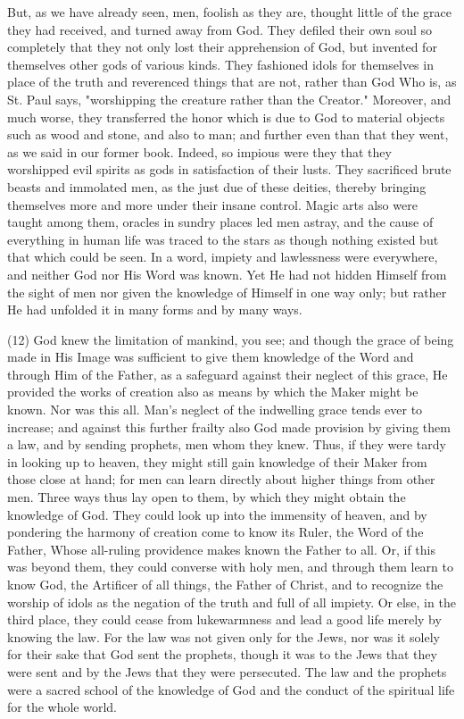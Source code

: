 \documentclass[9pt, twocolumn, oneside, a4paper]{memoir}
\begin{document}
But, as we have already seen, men, foolish as they are, thought little of the       grace they had received, and turned away from God. They defiled their own soul       so completely that they not only lost their apprehension of God, but invented       for themselves other gods of various kinds. They fashioned idols for themselves       in place of the truth and reverenced things that are not, rather than God Who       is, as St. Paul says, "worshipping the creature rather than the       Creator."       Moreover, and much worse, they transferred the honor which is due to God to       material objects such as wood and stone, and also to man; and further       even than       that they went, as we said in our former book. Indeed, so impious were they that       they worshipped evil spirits as gods in satisfaction of their lusts. They       sacrificed brute beasts and immolated men, as the just due of these deities,       thereby bringing themselves more and more under their insane control. Magic arts       also were taught among them, oracles in sundry places led men astray, and the       cause of everything in human life was traced to the stars as though nothing       existed but that which could be seen. In a word, impiety and lawlessness were       everywhere, and neither God nor His Word was known. Yet He had not hidden       Himself from the sight of men nor given the knowledge of Himself in one way       only; but rather He had unfolded it in many forms and by many ways.   

\textsc{(12)} God knew the limitation of mankind, you see; and       though the grace of being made in His Image was sufficient to give them       knowledge of the Word and through Him of the Father, as a safeguard against       their neglect of this grace, He provided the works of creation also as means by       which the Maker might be known. Nor was this all. Man's neglect of the       indwelling grace tends ever to increase; and against this further frailty also       God made provision by giving them a law, and by sending prophets, men whom they       knew. Thus, if they were tardy in looking up to heaven, they might still gain       knowledge of their Maker from those close at hand; for men can learn directly       about higher things from other men. Three ways thus lay open to them, by which       they might obtain the knowledge of God. They could look up into the immensity of       heaven, and by pondering the harmony of creation come to know its Ruler, the       Word of the Father, Whose all-ruling providence makes known the Father to all.       Or, if this was beyond them, they could converse with holy men, and through them       learn to know God, the Artificer of all things, the Father of Christ, and to       recognize the worship of idols as the negation of the truth and full of all       impiety. Or else, in the third place, they could cease from lukewarmness and       lead a good life merely by knowing the law. For the law was not given only for       the Jews, nor was it solely for their sake that God sent the prophets, though it       was to the Jews that they were sent and by the Jews that they were persecuted.       The law and the prophets were a sacred school of the knowledge of God and the       conduct of the spiritual life for the whole world.   
\end{document}
